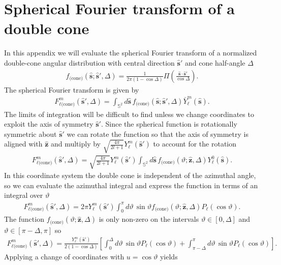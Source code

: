 \documentclass[]{osa-article}
\providecommand{\mh}[1]{\mathbf{\hat{#1}}}
\providecommand{\mbb}[1]{\mathbb{#1}}
\begin{document}
\section{Spherical Fourier transform of a double cone}\label{sec:cone}
In this appendix we will evaluate the spherical Fourier transform of a
normalized double-cone angular distribution with central direction $\mh{s}'$ and
cone half-angle $\Delta$
\begin{align}
  f_{\text{(cone)}}(\mh{s}; \mh{s}', \Delta) = \frac{1}{2\pi(1 - \cos\Delta)}\Pi\left(\frac{\mh{s}\cdot\mh{s}'}{\cos\Delta}\right). 
\end{align}
The spherical Fourier transform is given by
\begin{align}
  F_{\ell\text{(cone)}}^m(\mh{s}', \Delta) = \int_{\mbb{S}^2}d\mh{s}\, f_{\text{(cone)}}(\mh{s}; \mh{s}', \Delta)\bar{Y}_\ell^m(\mh{s}).
\end{align}
The limits of integration will be difficult to find unless we change coordinates
to exploit the axis of symmetry $\mh{s}'$. Since the spherical function is
rotationally symmetric about $\mh{s}'$ we can rotate the function so that the axis of
symmetry is aligned with $\mh{z}$ and multiply by $\sqrt{\frac{4\pi}{2l+1}}Y_\ell^m(\mh{s}')$ to account for the rotation
\begin{align}
    F_{\ell\text{(cone)}}^m(\mh{s}', \Delta) = \sqrt{\frac{4\pi}{2l+1}}Y_\ell^m(\mh{s}')\int_{\mbb{S}^2}d\mh{s}\, f_{\text{(cone)}}(\vartheta; \mh{z}, \Delta)Y_\ell^0(\mh{s}). 
\end{align}
In this coordinate system the double cone is independent of the azimuthal angle,
so we can evaluate the azimuthal integral and express the function in terms of an
integral over
$\vartheta$
\begin{align}
    F_{\ell\text{(cone)}}^m(\mh{s}', \Delta) = 2\pi Y_\ell^m(\mh{s}')\int_{0}^\pi d\vartheta\, \sin\vartheta f_{\text{(cone)}}(\vartheta; \mh{z}, \Delta)P_\ell(\cos\vartheta). 
\end{align}
The function $f_{\text{(cone)}}(\vartheta; \mh{z}, \Delta)$ is only non-zero on
the intervals $\vartheta \in [0, \Delta]$ and
$\vartheta \in [\pi - \Delta, \pi]$ so
\begin{align}
    F_{\ell\text{(cone)}}^m(\mh{s}', \Delta) = \frac{Y_\ell^m(\mh{s}')}{2(1 - \cos\Delta)}\left[\int_{0}^\Delta d\vartheta\, \sin\vartheta P_\ell(\cos\vartheta) + \int_{\pi - \Delta}^\pi d\vartheta\, \sin\vartheta P_\ell(\cos\vartheta)\right]. 
\end{align}
Applying a change of coordinates with $u = \cos\vartheta$ yields
\end{document}
